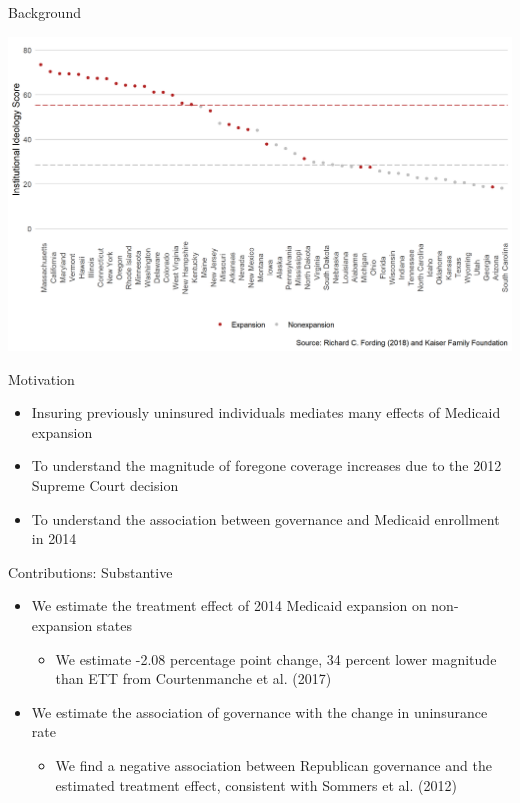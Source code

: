 \documentclass[hyperref={pdfpagelabels=false}]{beamer}
\begin{document}
\begin{frame}{Background}
    \begin{center}
	\includegraphics[scale=0.5]{01_Plots/political-expansion-plot.png}
    \end{center}
\end{frame}

\begin{frame}{Motivation}
    \begin{itemize}
    \item Insuring previously uninsured individuals mediates many effects of Medicaid expansion \bigskip
    \item To understand the magnitude of foregone coverage increases due to the 2012 Supreme Court decision \bigskip
    \item To understand the association between governance and Medicaid enrollment in 2014 
    \end{itemize} 
\end{frame}

\begin{frame}{Contributions: Substantive}
\begin{itemize}
    \item We estimate the treatment effect of 2014 Medicaid expansion on non-expansion states \bigskip
    
    \begin{itemize}
        \item We estimate -2.08 percentage point change, 34 percent lower magnitude than ETT from Courtenmanche et al. (2017) \bigskip 
    \end{itemize}

    \item We estimate the association of governance with the change in uninsurance rate \bigskip
    
    \begin{itemize}
        \item We find a negative association between Republican governance and the estimated treatment effect, consistent with Sommers et al. (2012) \bigskip 
    \end{itemize}
    \end{itemize}
\end{frame}
\end{document}
